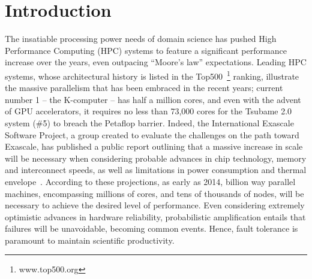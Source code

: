 \section{Introduction}

The insatiable processing power needs of domain science has pushed High
Performance Computing (HPC) systems to feature a significant
performance increase over the years, even outpacing ``Moore's law''
expectations. Leading HPC systems, whose architectural history is listed
in the Top500~\footnote{www.top500.org} ranking, illustrate the massive
parallelism that has been embraced in the recent years;
current number 1 -- the K-computer -- has half a million cores, and even with
the advent of GPU accelerators, it requires no less than 73,000
cores for the Tsubame 2.0 system (\#5) to breach the Petaflop
barrier. Indeed, the International Exascale Software Project, a group
created to evaluate the challenges on the path toward Exascale, has published a public report outlining that a massive
increase in scale will be necessary when considering probable advances
in chip technology, memory and interconnect speeds, as well as
limitations in power consumption and thermal envelope~\cite{iesp}.
According to these projections, as early as 2014, billion way parallel
machines, encompassing millions of cores, and tens of
thousands of nodes, will be necessary to achieve the desired level of
performance. Even considering extremely optimistic advances in hardware
reliability, probabilistic amplification entails that failures will be
unavoidable, becoming common events. Hence, fault tolerance is paramount
to maintain scientific productivity.

